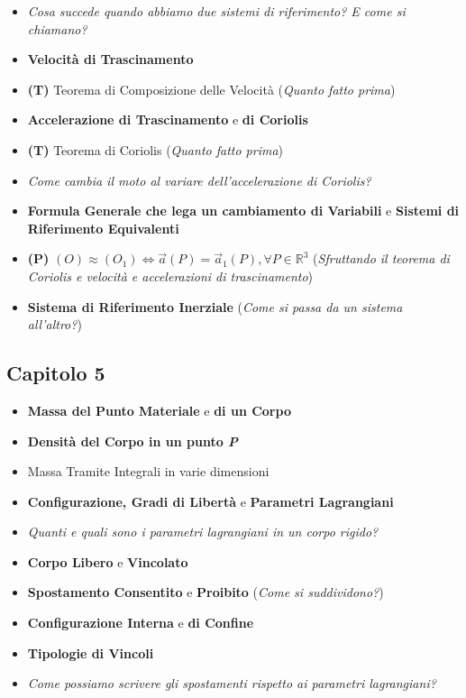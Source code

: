 \documentclass[11pt,a4paper,twoside]{article}
\begin{document}
\begin{itemize}
	\item \textit{Cosa succede quando abbiamo due sistemi di riferimento? E come si chiamano?}
	\item \textbf{Velocità di Trascinamento}
	\item \textbf{(T)} Teorema di Composizione delle Velocità (\textit{Quanto fatto prima})
	\item \textbf{Accelerazione di Trascinamento} e \textbf{di Coriolis}
	\item \textbf{(T)} Teorema di Coriolis (\textit{Quanto fatto prima})
	\item \textit{Come cambia il moto al variare dell'accelerazione di Coriolis?}
	\item \textbf{Formula Generale che lega un cambiamento di Variabili} e \textbf{Sistemi di Riferimento Equivalenti}
	\item \textbf{(P)} $(O)\approx (O_1) \Leftrightarrow \vec a(P) = \vec a_1(P), \forall P \in\mathbb R^3$ (\textit{Sfruttando il teorema di Coriolis e velocità e accelerazioni di trascinamento})
	\item \textbf{Sistema di Riferimento Inerziale} (\textit{Come si passa da un sistema all'altro?})
\end{itemize}

\subsection*{Capitolo 5}

\begin{itemize}
	\item \textbf{Massa del Punto Materiale} e \textbf{di un Corpo}
	\item \textbf{Densità del Corpo in un punto \textit{P}}
	\item Massa Tramite Integrali in varie dimensioni
	\item \textbf{Configurazione, Gradi di Libertà} e \textbf{Parametri Lagrangiani}
	\item \textit{Quanti e quali sono i parametri lagrangiani in un corpo rigido?}
	\item \textbf{Corpo Libero} e \textbf{Vincolato}
	\item \textbf{Spostamento Consentito} e \textbf{Proibito} (\textit{Come si suddividono?})
	\item \textbf{Configurazione Interna} e \textbf{di Confine}
	\item \textbf{Tipologie di Vincoli}
	\item \textit{Come possiamo scrivere gli spostamenti rispetto ai parametri lagrangiani?}
\end{itemize}
\end{document}
